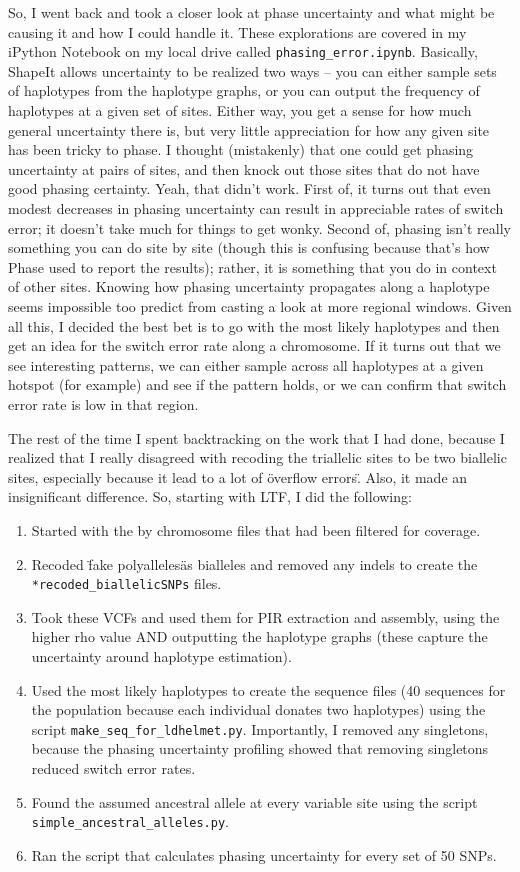 \documentclass[idxtotoc,hyperref,openany,oneside]{labbook} %
\begin{document}
So, I went back and took a closer look at phase uncertainty and what might be causing it and how I could handle it. These explorations are covered in my iPython Notebook on my local drive called \verb+phasing_error.ipynb+. Basically, ShapeIt allows uncertainty to be realized two ways -- you can either sample sets of haplotypes from the haplotype graphs, or you can output the frequency of haplotypes at a given set of sites. Either way, you get a sense for how much general uncertainty there is, but very little appreciation for how any given site has been tricky to phase. I thought (mistakenly) that one could get phasing uncertainty at pairs of sites, and then knock out those sites that do not have good phasing certainty. Yeah, that didn't work. First of, it turns out that even modest decreases in phasing uncertainty can result in appreciable rates of switch error; it doesn't take much for things to get wonky. Second of, phasing isn't really something you can do site by site (though this is confusing because that's how Phase used to report the results); rather, it is something that you do in context of other sites. Knowing how phasing uncertainty propagates along a haplotype seems impossible too predict from casting a look at more regional windows. Given all this, I decided the best bet is to go with the most likely haplotypes and then get an idea for the switch error rate along a chromosome. If it turns out that we see interesting patterns, we can either sample across all haplotypes at a given hotspot (for example) and see if the pattern holds, or we can confirm that switch error rate is low in that region.

The rest of the time I spent backtracking on the work that I had done, because I realized that I really disagreed with recoding the triallelic sites to be two biallelic sites, especially because it lead to a lot of \"overflow errors\". Also, it made an insignificant difference. So, starting with LTF, I did the following:
\begin{enumerate}
\item Started with the by chromosome files that had been filtered for coverage.
\item Recoded \"fake polyalleles\" as bialleles and removed any indels to create the \verb+*recoded_biallelicSNPs+ files.
\item Took these VCFs and used them for PIR extraction and assembly, using the higher rho value AND outputting the haplotype graphs (these capture the uncertainty around haplotype estimation).
\item Used the most likely haplotypes to create the sequence files (40 sequences for the population because each individual donates two haplotypes) using the script \verb+make_seq_for_ldhelmet.py+. Importantly, I removed any singletons, because the phasing uncertainty profiling showed that removing singletons reduced switch error rates.
\item Found the assumed ancestral allele at every variable site using the script \verb+simple_ancestral_alleles.py+.
\item Ran the script that calculates phasing uncertainty for every set of 50 SNPs.
\end{enumerate}
\end{document}
